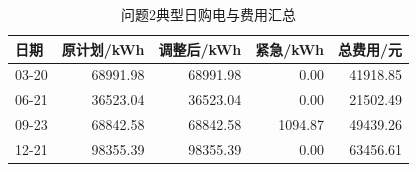 \begin{table}[H]
\centering\small
\caption{问题2典型日购电与费用汇总}
\label{tab:q2_daily_summary}
\begin{tabular}{lrrrr}\toprule
日期 & 原计划/kWh & 调整后/kWh & 紧急/kWh & 总费用/元 \\\midrule
03-20 & 68991.98 & 68991.98 & 0.00 & 41918.85 \\
06-21 & 36523.04 & 36523.04 & 0.00 & 21502.49 \\
09-23 & 68842.58 & 68842.58 & 1094.87 & 49439.26 \\
12-21 & 98355.39 & 98355.39 & 0.00 & 63456.61 \\
\bottomrule\end{tabular}
\end{table}
